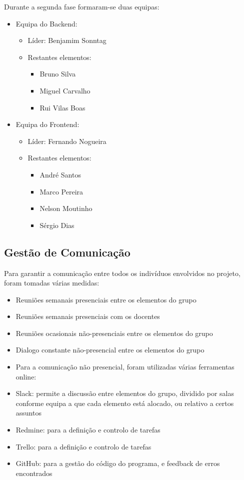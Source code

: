 Durante a segunda fase formaram-se duas equipas:
\begin{itemize}
    \item Equipa do Backend:
        \begin{itemize}
            \item Líder: Benjamim Sonntag
            \item Restantes elementos:
                \begin{itemize}
                    \item Bruno Silva
                    \item Miguel Carvalho
                    \item Rui Vilas Boas
                \end{itemize}
        \end{itemize}
    \item Equipa do Frontend:
        \begin{itemize}
            \item Líder: Fernando Nogueira
            \item Restantes elementos:
                \begin{itemize}
                    \item André Santos
                    \item Marco Pereira
                    \item Nelson Moutinho
                    \item Sérgio Dias
                \end{itemize}
        \end{itemize}
\end{itemize}

\subsection*{Gestão de Comunicação}
Para garantir a comunicação entre todos os indivíduos envolvidos no projeto, foram tomadas várias medidas:
\begin{itemize}
    \item Reuniões semanais presenciais entre os elementos do grupo
    \item Reuniões semanais presenciais com os docentes
    \item Reuniões ocasionais não-presenciais entre os elementos do grupo
    \item Dialogo constante não-presencial entre os elementos do grupo
    \item Para a comunicação não presencial, foram utilizadas várias ferramentas online:
    \item Slack: permite a discussão entre elementos do grupo, dividido por salas conforme equipa a que cada elemento está alocado, ou relativo a certos assuntos
    \item Redmine: para a definição e controlo de tarefas
    \item Trello: para a definição e controlo de tarefas
    \item GitHub: para a gestão do código do programa, e feedback de erros encontrados
\end{itemize}

